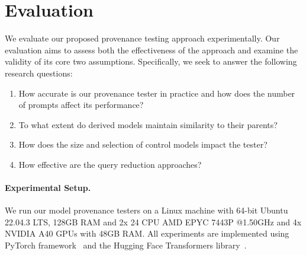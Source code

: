 \section{Evaluation}
\label{sec:eval}


We evaluate our proposed provenance testing approach experimentally. Our evaluation aims to assess both the effectiveness of the approach and examine the validity of its core two assumptions. Specifically, we seek to answer the following research questions:\begin{enumerate}[label=(RQ\arabic*)]
\item How accurate is our provenance tester in practice and how does the number of prompts affect its performance?
\item To what extent do derived models maintain similarity to their parents?
\item How does the size and selection of control models impact the tester?\item How effective are the query reduction approaches?
\end{enumerate}

%
%
\paragraph{Experimental Setup.} 
We run our model provenance testers on a Linux machine with 64-bit Ubuntu 22.04.3 LTS, 128GB RAM and
2x 24 CPU AMD EPYC 7443P @1.50GHz and 4x NVIDIA A40 GPUs with 48GB RAM. All experiments are implemented using PyTorch framework~\cite{paszke2019pytorch} and the Hugging Face Transformers library~\cite{transformers}.

%
%
